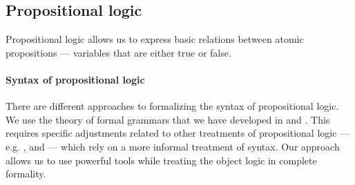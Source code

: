 \subsection{Propositional logic}\label{subsec:propositional_logic}

Propositional logic allows us to express basic relations between atomic propositions --- variables that are either true or false.

\paragraph{Syntax of propositional logic}

\begin{remark}\label{rem:propositional_syntax_and_grammars}
  There are different approaches to formalizing the syntax of propositional logic. We use the theory of formal grammars that we have developed in  and . This requires specific adjustments related to other treatments of propositional logic --- e.g. ,  and  --- which rely on a more informal treatment of syntax. Our approach allows us to use powerful tools while treating the object logic in complete formality.
\end{remark}

